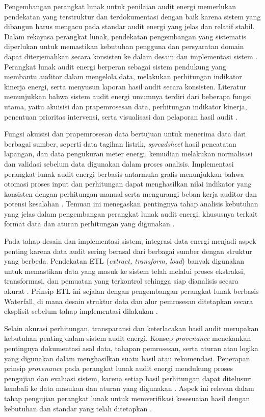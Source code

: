 Pengembangan perangkat lunak untuk penilaian audit energi memerlukan pendekatan yang terstruktur dan terdokumentasi dengan baik karena sistem yang dibangun harus mengacu pada standar audit energi yang jelas dan relatif stabil. Dalam rekayasa perangkat lunak, pendekatan pengembangan yang sistematis diperlukan untuk memastikan kebutuhan pengguna dan persyaratan domain dapat diterjemahkan secara konsisten ke dalam desain dan implementasi sistem \cite{sommerville2016software}. Perangkat lunak audit energi berperan sebagai sistem pendukung yang membantu auditor dalam mengelola data, melakukan perhitungan indikator kinerja energi, serta menyusun laporan hasil audit secara konsisten. Literatur menunjukkan bahwa sistem audit energi umumnya terdiri dari beberapa fungsi utama, yaitu akuisisi dan prapemrosesan data, perhitungan indikator kinerja, penentuan prioritas intervensi, serta visualisasi dan pelaporan hasil audit \cite{hermawan2022perencanaan}.

Fungsi akuisisi dan prapemrosesan data bertujuan untuk menerima data dari berbagai sumber, seperti data tagihan listrik, \textit{spreadsheet} hasil pencatatan lapangan, dan data pengukuran meter energi, kemudian melakukan normalisasi dan validasi sebelum data digunakan dalam proses analisis. Implementasi perangkat lunak audit energi berbasis antarmuka grafis menunjukkan bahwa otomasi proses input dan perhitungan dapat menghasilkan nilai indikator yang konsisten dengan perhitungan manual serta mengurangi beban kerja auditor dan potensi kesalahan \cite{fitri2022sistem}. Temuan ini menegaskan pentingnya tahap analisis kebutuhan yang jelas dalam pengembangan perangkat lunak audit energi, khususnya terkait format data dan aturan perhitungan yang digunakan \cite{sommerville2016software}.

Pada tahap desain dan implementasi sistem, integrasi data energi menjadi aspek penting karena data audit sering berasal dari berbagai sumber dengan struktur yang berbeda. Pendekatan ETL (\textit{extract, transform, load}) banyak digunakan untuk memastikan data yang masuk ke sistem telah melalui proses ekstraksi, transformasi, dan pemuatan yang terkontrol sehingga siap dianalisis secara akurat \cite{luciano2011integrating}. Prinsip ETL ini sejalan dengan pengembangan perangkat lunak berbasis Waterfall, di mana desain struktur data dan alur pemrosesan ditetapkan secara eksplisit sebelum tahap implementasi dilakukan \cite{sommerville2016software}.

Selain akurasi perhitungan, transparansi dan keterlacakan hasil audit merupakan kebutuhan penting dalam sistem audit energi. Konsep \textit{provenance} menekankan pentingnya dokumentasi asal data, tahapan pemrosesan, serta aturan atau logika yang digunakan dalam menghasilkan suatu hasil atau rekomendasi. Penerapan prinsip \textit{provenance} pada perangkat lunak audit energi mendukung proses pengujian dan evaluasi sistem, karena setiap hasil perhitungan dapat ditelusuri kembali ke data masukan dan aturan yang digunakan \cite{kale2023provenance}. Aspek ini relevan dalam tahap pengujian perangkat lunak untuk memverifikasi kesesuaian hasil dengan kebutuhan dan standar yang telah ditetapkan \cite{sommerville2016software}.

